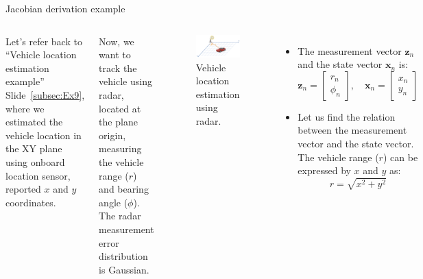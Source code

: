 \begin{frame}{Jacobian derivation example}
\vspace{-5pt}
\begin{columns}
Let's refer back to “Vehicle location estimation example” Slide~\ref{subsec:Ex9}, where we estimated the vehicle location in the XY plane using onboard location sensor, reported \(x\) and \(y\) coordinates.
\vspace{5pt}

Now, we want to track the vehicle using radar, located at the plane origin, measuring the vehicle range (\(r\)) and bearing angle (\(\phi\)). The radar measurement error distribution is Gaussian.
\vspace{-7pt}
\begin{figure}
    \centering
    \includegraphics[width=0.4\linewidth]{Figures//Part3/VehicleLocation_Radar.png}
    \vspace{-8pt}
    \caption{Vehicle location estimation using radar.}
    \label{fig:enter-label}
    \vspace{-14pt}
\end{figure}

\begin{itemize}
    \item The measurement vector \(\mathbf{z}_n\) and the state vector \(\mathbf{x}_n\) is:
\[
\mathbf{z}_n =
\begin{bmatrix}
r_n \\
\phi_n
\end{bmatrix}, \quad \mathbf{x}_n =
\begin{bmatrix}
x_n \\
y_n
\end{bmatrix}
\]
\item Let us find the relation between the measurement vector and the state vector. The vehicle range (\(r\)) can be expressed by \(x\) and \(y\) as:
    \[
    r = \sqrt{x^2 + y^2}
    \]
\end{itemize}


\end{columns}
\end{frame}
